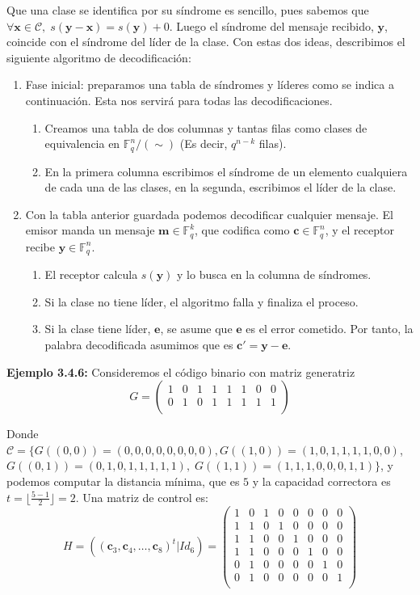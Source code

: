 \documentclass[11pt,spanish]{book}
\begin{document}
Que una clase se identifica por su síndrome es sencillo, pues sabemos que $\forall \mathbf{x}\in\mathcal{C},\; s(\mathbf{y}-\mathbf{x})=s(\mathbf{y})+0$. Luego el síndrome del mensaje recibido, $\mathbf{y}$, coincide con el síndrome del líder de la clase. Con estas dos ideas, describimos el siguiente algoritmo de decodificación:
\begin{enumerate}
    \item Fase inicial: preparamos una tabla de síndromes y líderes como se indica a continuación. Esta nos servirá para todas las decodificaciones.
  \begin{enumerate}
       \item Creamos una tabla de dos columnas y tantas filas como clases de equivalencia en $\mathbb{F}^{n}_{q}/(\sim)$ (Es decir, $q^{n-k}$ filas).
        \item En la primera columna escribimos el síndrome de un elemento cualquiera de cada una de las clases, en la segunda, escribimos el líder de la clase.
  \end{enumerate} 
  \item Con la tabla anterior guardada podemos decodificar cualquier mensaje. El emisor manda un mensaje $\mathbf{m}\in\mathbb{F}_q^{k}$, que codifica como $\mathbf{c}\in\mathbb{F}_q^{n}$, y el receptor recibe $\mathbf{y}\in\mathbb{F}_q^{n}$.
  \begin{enumerate}
      \item El receptor calcula $s(\mathbf{y})$ y lo busca en la columna de síndromes.
      \item Si la clase no tiene líder, el algoritmo falla y finaliza el proceso.
      \item Si la clase tiene líder, $\mathbf{e}$, se asume que $\mathbf{e}$ es el error cometido. Por tanto, la palabra decodificada asumimos que es $\mathbf{c'}=\mathbf{y}-\mathbf{e}$. 
   \end{enumerate}
\end{enumerate}
\textbf{Ejemplo 3.4.6: } Consideremos el código binario con matriz generatriz
$$G= 
\begin{pmatrix}
1 & 0 & 1 & 1 & 1 & 1 & 0 & 0\\
0 & 1 & 0 & 1 & 1 & 1 & 1 & 1\\
\end{pmatrix}
$$

Donde $\mathcal{C}=\{G((0,0))=(0,0,0,0,0,0,0,0), G((1,0))=(1,0,1,1,1,1,0,0)$,\\ $G((0,1))=(0,1,0,1,1,1,1,1),\; G((1,1))=(1,1,1,0,0,0,1,1)\}$, y podemos computar la distancia mínima, que es $5$ y la capacidad correctora es $t=\lfloor \frac{5-1}{2}\rfloor = 2$. Una matriz de control es:
$$
H=((\mathbf{c}_3,\mathbf{c}_4,\ldots,\mathbf{c}_8)^{t}|Id_6)=
\begin{pmatrix}
1 & 0 & 1 & 0 & 0 & 0 & 0 & 0\\
1 & 1 & 0 & 1 & 0 & 0 & 0 & 0\\
1 & 1 & 0 & 0 & 1 & 0 & 0 & 0\\
1 & 1 & 0 & 0 & 0 & 1 & 0 & 0\\
0 & 1 & 0 & 0 & 0 & 0 & 1 & 0\\
0 & 1 & 0 & 0 & 0 & 0 & 0 & 1\\
\end{pmatrix}
$$
\end{document}
